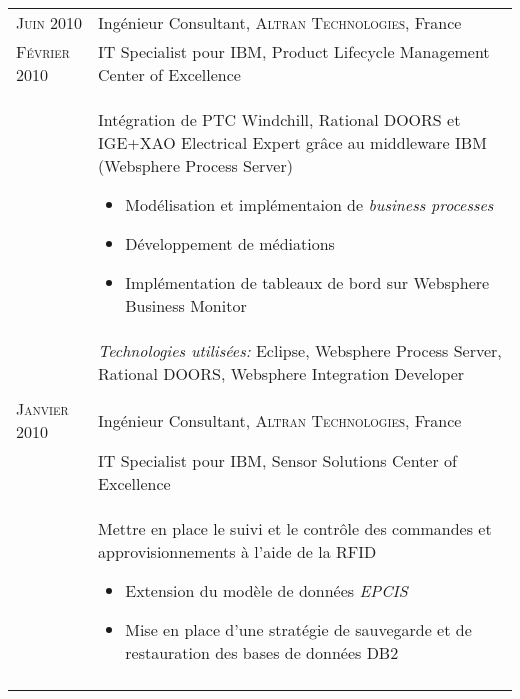 \begin{longtable}{R{2.5cm}|p{14.8cm}}
	\textsc{Juin 2010}      & Ingénieur Consultant, \textsc{Altran Technologies}, France                                                                                \\
	\textsc{Février 2010}   & IT Specialist pour IBM, Product Lifecycle Management Center of Excellence                                                                 \\&
	\footnotesize{
		Intégration de PTC Windchill, Rational DOORS et IGE+XAO Electrical Expert grâce au middleware IBM (Websphere Process Server)
		\begin{itemize}
			\item Modélisation et implémentaion de \emph{business processes}
			\item Développement de médiations
			\item Implémentation de tableaux de bord sur Websphere Business Monitor
		\end{itemize}
		\vspace{-1em}
	}                                                                                                                                                                   \\&
	\footnotesize{\emph{Technologies utilisées:} Eclipse, Websphere Process Server, Rational DOORS, Websphere Integration Developer }                                   \\
	                                                                                                                                                \\
	\textsc{Janvier 2010}   & Ingénieur Consultant, \textsc{Altran Technologies}, France                                                                                \\
	                        & IT Specialist pour IBM, Sensor Solutions Center of Excellence                                                                             \\&
	\footnotesize{
		Mettre en place le suivi et le contrôle des commandes et approvisionnements à l'aide de la RFID
		\begin{itemize}
			\item Extension du modèle de données \emph{EPCIS}
			\item Mise en place d'une stratégie de sauvegarde et de restauration des bases de données DB2
		\end{itemize}
		\vspace{-1em}
	}                                                                                                                                                                   \\&

\end{longtable}
